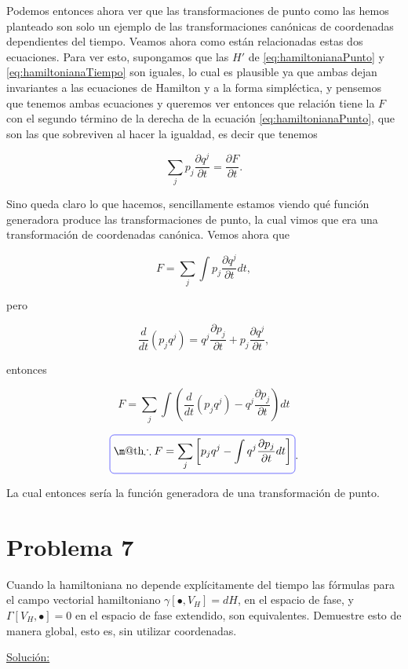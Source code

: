 \documentclass[a4paper,10pt]{article}
\makeatletter
\numberwithin{equation}{section}
\newcommand*{\boxcolor}{blue}
\renewcommand{\boxed}[1]{\textcolor{\boxcolor}{%
\tikz[baseline={([yshift=-1ex]current bounding box.center)}] \node [rectangle, minimum width=1ex,rounded corners,draw] {\normalcolor\m@th$\displaystyle#1$};}}
\makeatother
\begin{document}
Podemos entonces ahora ver que las transformaciones de punto como las hemos planteado 
son solo un ejemplo de las transformaciones canónicas de coordenadas dependientes 
del tiempo. Veamos ahora como están relacionadas estas dos ecuaciones. Para ver esto, 
supongamos que las $H'$ de \eqref{eq:hamiltonianaPunto} y \eqref{eq:hamiltonianaTiempo} 
son iguales, lo cual es plausible ya que ambas dejan invariantes a las ecuaciones 
de Hamilton y a la forma simpléctica, y pensemos que tenemos ambas ecuaciones 
y queremos ver entonces que relación tiene la $F$ con el segundo término de la 
derecha de la ecuación \eqref{eq:hamiltonianaPunto}, que son las que sobreviven 
al hacer la igualdad, es decir que tenemos 

\begin{equation}
 \sum_j p_j \frac{\partial q^j}{\partial t} = \frac{\partial F}{\partial t}.
\end{equation}

Sino queda claro lo que hacemos, sencillamente estamos viendo qué función generadora 
produce las transformaciones de punto, la cual vimos que era una transformación de 
coordenadas canónica. Vemos ahora que 

\begin{equation}
 F = \sum_j \int p_j \frac{\partial q^j}{\partial t}dt,
\end{equation}

pero 

\begin{equation}
 \frac{d}{dt}(p_jq^j) = q^j\frac{\partial p_j}{\partial t} +
 p_j\frac{\partial q^j}{\partial t},
\end{equation}

entonces 

\begin{equation}
 F = \sum_j \int \left(\frac{d}{dt}(p_j q^j) - q^j\frac{\partial p_j}{\partial t}\right)dt
\end{equation}

\begin{equation}
 \boxed{\therefore F = \sum_j \left[p_j q^j - \int q^j \frac{\partial p_j}{\partial t}dt\right]}.
\end{equation}


La cual entonces sería la función generadora de una transformación de punto.

\section{Problema 7}

Cuando la hamiltoniana no depende explícitamente del tiempo las fórmulas para el 
campo vectorial hamiltoniano $\gamma[\bullet,V_H] = dH$, en el espacio de fase, 
y $\Gamma[V_H,\bullet] = 0$ en el espacio de fase extendido, son equivalentes. 
Demuestre esto de manera global, esto es, sin utilizar coordenadas.

\vspace{.3cm}

\underline{Solución:} \vspace{.3cm}
\end{document}
